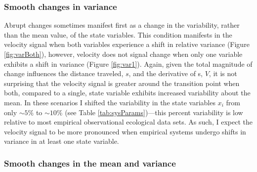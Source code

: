 \documentclass[print]{nuthesis}
\begin{document}
\hypertarget{smooth-changes-in-variance}{%
\subsubsection{Smooth changes in variance}\label{smooth-changes-in-variance}}

Abrupt changes sometimes manifest first as a change in the variability, rather than the mean value, of the state variables. This condition manifests in the velocity signal when both variables experience a shift in relative variance (Figure \ref{fig:varBoth}), however, velocity does not signal change when only one variable exhibits a shift in variance (Figure \ref{fig:var1}). Again, given the total magnitude of change influences the distance traveled, \(s\), and the derivative of s, \(V\), it is not surprising that the velocity signal is greater around the transition point when both, compared to a single, state variable exhibits increased variability about the mean. In these scenarios I shifted the variability in the state variables \(x_i\) from only \(\sim 5\%\) to \(\sim10\%\) (see Table \ref{tab:sysParams})---this percent variability is low relative to most empirical observational ecological data sets. As such, I expect the velocity signal to be more pronounced when empirical systems undergo shifts in variance in at least one state variable.

\hypertarget{smooth-changes-in-the-mean-and-variance}{%
\subsubsection{Smooth changes in the mean and variance}\label{smooth-changes-in-the-mean-and-variance}}
\end{document}
